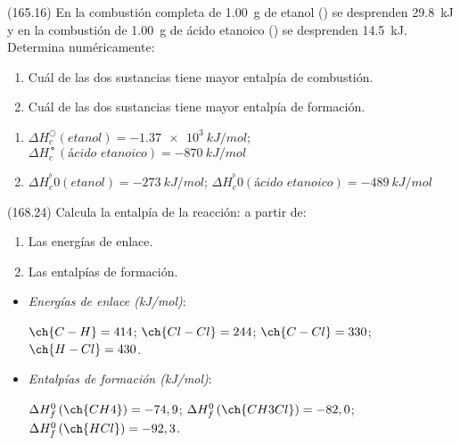   \begin{exercise}[
      tags    = {},
      topics  = {química, termodinámica, termoquímica},
      source  = {FQ 1B MGH 2016, p165, e16},
    ]
    (165.16) En la combustión completa de \SI{1.00}{\gram} de etanol () se desprenden \SI{29.8}{kJ} y en la combustión de \SI{1.00}{\gram}
    de ácido etanoico () se desprenden \SI{14.5}{kJ}.
    Determina numéricamente:
    \begin{enumerate}
      \item Cuál de las dos sustancias tiene mayor entalpía de combustión.
      \item Cuál de las dos sustancias tiene mayor entalpía de formación.
    \end{enumerate}
  \end{exercise}

  \begin{solution}
    \begin{enumerate}
      \item \( \Delta H^○_c (\textit{etanol}) = \SI{-1.37e3}{kJ/mol} \); \newline
            \( \Delta H^\mdsmwhtcircle_c (\textit{ácido etanoico}) = \SI{-870}{kJ/mol} \) %
      \item \( \Delta H_c^^b0 (\textit{etanol}) = \SI{-273}{kJ/mol} \); \newline
            \( \Delta H_c^^b0 (\textit{ácido etanoico}) = \SI{-489}{kJ/mol} \) %
    \end{enumerate}
  \end{solution}




  \begin{exercise}[
      tags    = {},
      topics  = {química, termodinámica, termoquímica},
      source  = {FQ 1B MGH 2016, p168, e24},
    ]
    (168.24) Calcula la entalpía de la reacción:
     a partir de:
    \begin{enumerate}
      \item Las energías de enlace.
      \item Las entalpías de formación.
    \end{enumerate}

    \begin{gexdatos}
      \begin{itemize}
        \item \textit{Energías de enlace (\si{kJ/mol})}:

        \( \ch{C-H} = 414 \); \( \ch{Cl-Cl} = 244 \); \( \ch{C-Cl} = 330 \); \( \ch{H-Cl} = 430 \).

        \item \textit{Entalpías de formación (\si{kJ/mol})}:

        \( \Delta H^0_f\,(\ch{CH4}) = -74,9 \); \( \Delta H^0_f\,(\ch{CH3Cl}) = -82,0 \); \( \Delta H^0_f\,(\ch{HCl}) = -92,3 \).
      \end{itemize}
    \end{gexdatos}

  \end{exercise}


